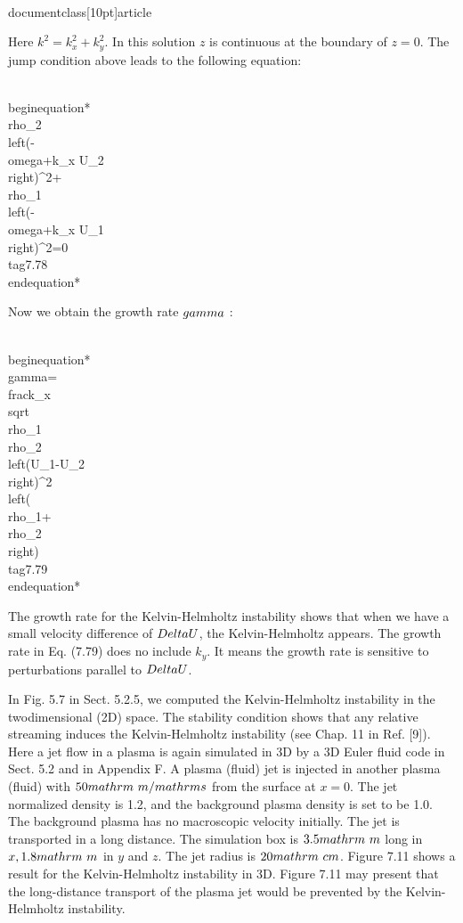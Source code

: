 \\documentclass[10pt]{article}
\begin{document}
{{{{Here $k^{2}=k_{x}^{2}+k_{y}^{2}$. In this solution $z$ is continuous at the boundary of $z=0$. The jump condition above leads to the following equation:


\\begin{equation*}
\\rho_{2}\\left(-\\omega+k_{x} U_{2}\\right)^{2}+\\rho_{1}\\left(-\\omega+k_{x} U_{1}\\right)^{2}=0 \\tag{7.78}
\\end{equation*}


Now we obtain the growth rate $\\gamma$ :


\\begin{equation*}
\\gamma=\\frac{k_{x} \\sqrt{\\rho_{1} \\rho_{2}\\left(U_{1}-U_{2}\\right)^{2}}}{\\left(\\rho_{1}+\\rho_{2}\\right)} \\tag{7.79}
\\end{equation*}


The growth rate for the Kelvin-Helmholtz instability shows that when we have a small velocity difference of $\\Delta U$, the Kelvin-Helmholtz appears. The growth rate in Eq. (7.79) does no include $k_{y}$. It means the growth rate is sensitive to perturbations parallel to $\\Delta U$.

In Fig. 5.7 in Sect. 5.2.5, we computed the Kelvin-Helmholtz instability in the twodimensional (2D) space. The stability condition shows that any relative streaming induces the Kelvin-Helmholtz instability (see Chap. 11 in Ref. [9]). Here a jet flow in a plasma is again simulated in 3D by a 3D Euler fluid code in Sect. 5.2 and in Appendix F. A plasma (fluid) jet is injected in another plasma (fluid) with $50 \\mathrm{~m} / \\mathrm{s}$ from the surface at $x=0$. The jet normalized density is 1.2, and the background plasma density is set to be 1.0. The background plasma has no macroscopic velocity
initially. The jet is transported in a long distance. The simulation box is $3.5 \\mathrm{~m}$ long in $x, 1.8 \\mathrm{~m}$ in $y$ and $z$. The jet radius is $20 \\mathrm{~cm}$. Figure 7.11 shows a result for the Kelvin-Helmholtz instability in 3D. Figure 7.11 may present that the long-distance transport of the plasma jet would be prevented by the Kelvin-Helmholtz instability.

}}}}
\end{document}
